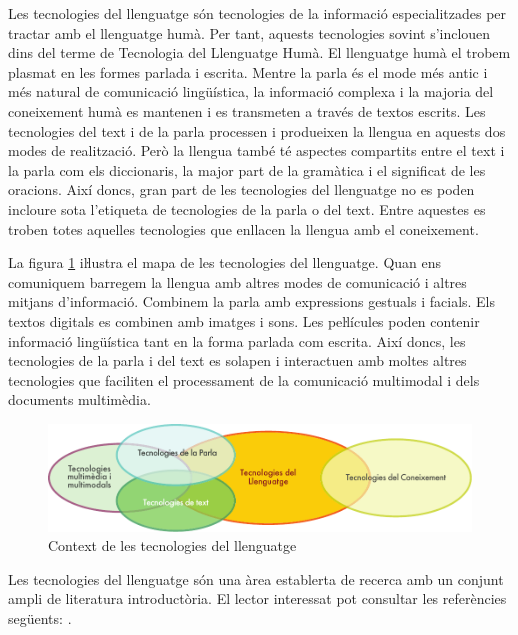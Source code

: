 \begin{multicols}{2}

Les tecnologies del llenguatge són tecnologies de la informació especialitzades per tractar amb el llenguatge humà. Per tant, aquests tecnologies sovint s’inclouen dins del terme de Tecnologia del Llenguatge Humà. El llenguatge humà el trobem plasmat en les formes parlada i escrita. Mentre la parla és el mode més antic i més natural de comunicació lingüística, la informació complexa i la majoria del coneixement humà es mantenen i es transmeten a través de textos escrits. Les tecnologies del text i de la parla processen i produeixen la llengua en aquests dos modes de realització. Però la llengua també té aspectes compartits entre el text i la parla com els diccionaris, la major part de la gramàtica i el significat de les oracions. Així doncs, gran part de les tecnologies del llenguatge no es poden incloure sota l’etiqueta de tecnologies de la parla o del text. Entre aquestes es troben totes aquelles tecnologies que enllacen la llengua amb el coneixement.

 La figura \ref{fig:ltincontext_ca} iŀlustra el mapa de les tecnologies del llenguatge. Quan ens comuniquem barregem la llengua amb altres modes de comunicació i altres mitjans d’informació. Combinem la parla amb expressions gestuals i facials. Els textos digitals es combinen amb imatges i sons. Les peŀlícules poden contenir informació lingüística tant en la forma parlada com escrita. Així doncs, les tecnologies de la parla i del text es solapen i interactuen amb moltes altres tecnologies que faciliten el processament de la comunicació multimodal i dels documents multimèdia.

\begin{figure}[htb]
  \vspace{-25mm}
  \center
  \includegraphics[width=\textwidth]{../_media/catalan/language_technologies}
  \caption{Context de les tecnologies del llenguatge}
  \label{fig:ltincontext_ca}
\end{figure}

Les tecnologies del llenguatge són una àrea establerta de recerca amb un conjunt ampli de literatura introductòria. El lector interessat pot consultar les referències següents: \cite{jurafsky-martin01, manning-schuetze1, lt-world1, lt-survey1}.


\end{multicols}
